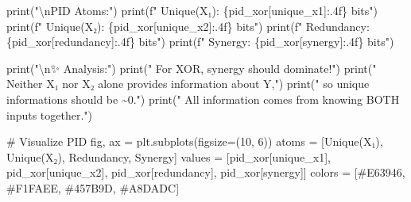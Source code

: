 \documentclass[
  11pt,
  letterpaper,
  oneside,
  openany]{book}
\newenvironment{Shaded}{\begin{snugshade}}{\end{snugshade}}
\newcommand{\BuiltInTok}[1]{\textcolor[rgb]{0.00,0.23,0.31}{#1}}
\newcommand{\CharTok}[1]{\textcolor[rgb]{0.13,0.47,0.30}{#1}}
\newcommand{\CommentTok}[1]{\textcolor[rgb]{0.37,0.37,0.37}{#1}}
\newcommand{\DecValTok}[1]{\textcolor[rgb]{0.68,0.00,0.00}{#1}}
\newcommand{\NormalTok}[1]{\textcolor[rgb]{0.00,0.23,0.31}{#1}}
\newcommand{\OperatorTok}[1]{\textcolor[rgb]{0.37,0.37,0.37}{#1}}
\newcommand{\SpecialCharTok}[1]{\textcolor[rgb]{0.37,0.37,0.37}{#1}}
\newcommand{\SpecialStringTok}[1]{\textcolor[rgb]{0.13,0.47,0.30}{#1}}
\newcommand{\StringTok}[1]{\textcolor[rgb]{0.13,0.47,0.30}{#1}}
\begin{document}
\begin{Shaded}
\begin{Highlighting}[]
\BuiltInTok{print}\NormalTok{(}\StringTok{"}\CharTok{\textbackslash{}n}\StringTok{PID Atoms:"}\NormalTok{)}
\BuiltInTok{print}\NormalTok{(}\SpecialStringTok{f"  Unique(X₁):  }\SpecialCharTok{\{}\NormalTok{pid\_xor[}\StringTok{\textquotesingle{}unique\_x1\textquotesingle{}}\NormalTok{]}\SpecialCharTok{:.4f\}}\SpecialStringTok{ bits"}\NormalTok{)}
\BuiltInTok{print}\NormalTok{(}\SpecialStringTok{f"  Unique(X₂):  }\SpecialCharTok{\{}\NormalTok{pid\_xor[}\StringTok{\textquotesingle{}unique\_x2\textquotesingle{}}\NormalTok{]}\SpecialCharTok{:.4f\}}\SpecialStringTok{ bits"}\NormalTok{)}
\BuiltInTok{print}\NormalTok{(}\SpecialStringTok{f"  Redundancy:  }\SpecialCharTok{\{}\NormalTok{pid\_xor[}\StringTok{\textquotesingle{}redundancy\textquotesingle{}}\NormalTok{]}\SpecialCharTok{:.4f\}}\SpecialStringTok{ bits"}\NormalTok{)}
\BuiltInTok{print}\NormalTok{(}\SpecialStringTok{f"  Synergy:     }\SpecialCharTok{\{}\NormalTok{pid\_xor[}\StringTok{\textquotesingle{}synergy\textquotesingle{}}\NormalTok{]}\SpecialCharTok{:.4f\}}\SpecialStringTok{ bits"}\NormalTok{)}

\BuiltInTok{print}\NormalTok{(}\StringTok{"}\CharTok{\textbackslash{}n}\StringTok{✨ Analysis:"}\NormalTok{)}
\BuiltInTok{print}\NormalTok{(}\StringTok{"  For XOR, synergy should dominate!"}\NormalTok{)}
\BuiltInTok{print}\NormalTok{(}\StringTok{"  Neither X₁ nor X₂ alone provides information about Y,"}\NormalTok{)}
\BuiltInTok{print}\NormalTok{(}\StringTok{"  so unique informations should be \textasciitilde{}0."}\NormalTok{)}
\BuiltInTok{print}\NormalTok{(}\StringTok{"  All information comes from knowing BOTH inputs together."}\NormalTok{)}

\CommentTok{\# Visualize PID}
\NormalTok{fig, ax }\OperatorTok{=}\NormalTok{ plt.subplots(figsize}\OperatorTok{=}\NormalTok{(}\DecValTok{10}\NormalTok{, }\DecValTok{6}\NormalTok{))}
\NormalTok{atoms }\OperatorTok{=}\NormalTok{ [}\StringTok{\textquotesingle{}Unique(X₁)\textquotesingle{}}\NormalTok{, }\StringTok{\textquotesingle{}Unique(X₂)\textquotesingle{}}\NormalTok{, }\StringTok{\textquotesingle{}Redundancy\textquotesingle{}}\NormalTok{, }\StringTok{\textquotesingle{}Synergy\textquotesingle{}}\NormalTok{]}
\NormalTok{values }\OperatorTok{=}\NormalTok{ [pid\_xor[}\StringTok{\textquotesingle{}unique\_x1\textquotesingle{}}\NormalTok{], pid\_xor[}\StringTok{\textquotesingle{}unique\_x2\textquotesingle{}}\NormalTok{], pid\_xor[}\StringTok{\textquotesingle{}redundancy\textquotesingle{}}\NormalTok{], pid\_xor[}\StringTok{\textquotesingle{}synergy\textquotesingle{}}\NormalTok{]]}
\NormalTok{colors }\OperatorTok{=}\NormalTok{ [}\StringTok{\textquotesingle{}\#E63946\textquotesingle{}}\NormalTok{, }\StringTok{\textquotesingle{}\#F1FAEE\textquotesingle{}}\NormalTok{, }\StringTok{\textquotesingle{}\#457B9D\textquotesingle{}}\NormalTok{, }\StringTok{\textquotesingle{}\#A8DADC\textquotesingle{}}\NormalTok{]}


\end{Highlighting}
\end{Shaded}
\end{document}
